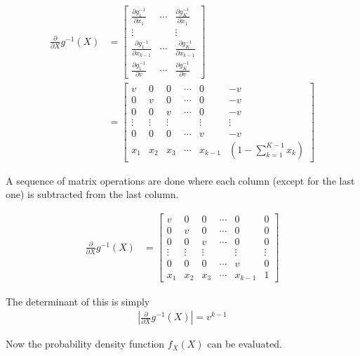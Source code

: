 \begin{align}
    \frac{\partial}{\partial X} g^{-1}(X) &= \begin{bmatrix} \frac{\partial g_1^{-1}}{\partial x_1} & \cdots & \frac{\partial g_K^{-1}}{\partial x_1}\\
    \vdots & & \vdots\\
    \frac{\partial g_1^{-1}}{\partial x_{k-1}} & \cdots & \frac{\partial g_K^{-1}}{\partial x_{k-1}} \\
    \frac{\partial g_1^{-1}}{\partial v} & \cdots & \frac{\partial g_K^{-1}}{\partial v}\end{bmatrix}\\
    &= \begin{bmatrix}
    v & 0 & 0 & \cdots & 0 & -v\\
    0 & v & 0 & \cdots & 0 & -v\\
    0 & 0 & v & \cdots & 0 & -v\\
    \vdots & \vdots & \vdots & & \vdots & \vdots\\
    0 & 0 & 0 & \cdots & v & -v\\
    x_1 & x_2 & x_3 & \cdots & x_{k-1} &\left(1 - \sum_{k=1}^{K-1} x_k \right)
    \end{bmatrix}
\end{align}

A sequence of matrix operations are done where each column (except for the last one) is subtracted from the last column.

\begin{align}
    \frac{\partial}{\partial X} g^{-1}(X) &= \begin{bmatrix}
    v & 0 & 0 & \cdots & 0 & 0\\
    0 & v & 0 & \cdots & 0 & 0\\
    0 & 0 & v & \cdots & 0 & 0\\
    \vdots & \vdots & \vdots & & \vdots & \vdots\\
    0 & 0 & 0 & \cdots & v & 0\\
    x_1 & x_2 & x_3 & \cdots & x_{k-1} & 1
    \end{bmatrix}
\end{align}

The determinant of this is simply
\begin{align}
    \left| \frac{\partial}{\partial X} g^{-1}(X) \right| = v^{k-1} \label{PC:det_of_jacobian}
\end{align}

Now the probability density function $f_X(X)$ can be evaluated. 


